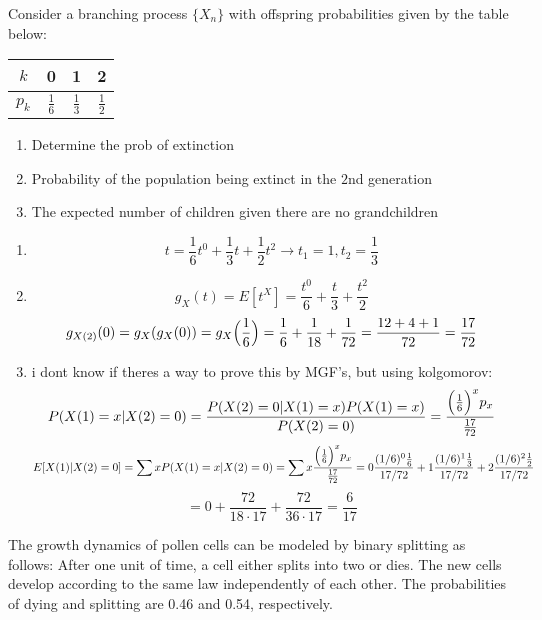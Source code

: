 \begin{enumerate}[label=(\alph*)]
\problem
Consider a branching process $\{X_n\}$ with offspring probabilities given by the table below:
\begin{center}
\begin{tabular}{c|c|c|c}
    $k$ & 0 & 1 & 2 \\ 
\hline
$p_k$ & $\frac{1}{6} $&$ \frac{1}{3}$ & $\frac{1}{2}$ \\ 
    
\end{tabular}
\end{center}
\begin{enumerate}
\item Determine the prob of extinction
\item Probability of the population being extinct in the $2$nd generation
\item The expected number of children given there are no grandchildren

\end{enumerate}


\solution
\begin{enumerate}
    \item \[
    t = \frac{1}{6}t^0 + \frac{1}{3}t + \frac{1}{2}t^2 \rightarrow t_1=1, t_2=\frac{1}{3}
    \]    
    \item \[
    g_X(t) = E[t^X] = \frac{t^0}{6} + \frac{t}{3} + \frac{t^2}{2} 
    \]
    \[
        g_{X(2)}(0) = g_X(g_X(0)) = g_X\Bigl(\frac{1}{6}\Bigr) = \frac{1}{6} + \frac{1}{18} + \frac{1}{72} = \frac{12+4+1}{72} = \frac{17}{72}     
    \]
    \item i dont know if theres a way to prove this by MGF's, but using kolgomorov:
    \[
        P(X(1)=x|X(2)=0) = \frac{P(X(2)=0|X(1)=x) P(X(1)=x)}{P(X(2)=0)} = \frac{\Bigl(\frac{1}{6}\Bigr)^x p_x}{\frac{17}{72}}
    \]
    \[
      E[X(1)|X(2)=0] = \sum x P(X(1)=x|X(2)=0)  = 
      \sum x \frac{\Bigl(\frac{1}{6}\Bigr)^x p_x}{\frac{17}{72}} =
      0\frac{(1/6)^0\frac{1}{6}}{17/72} + 1\frac{(1/6)^1\frac{1}{3}}{17/72} + 2\frac{(1/6)^2\frac{1}{2}}{17/72}
    \]
    \[
      = 0 + \frac{72}{18 \cdot 17} + \frac{72}{36 \cdot 17} = \frac{6}{17} 
    \]

\end{enumerate}


\problem
\problem
\problem
The growth dynamics of pollen cells can be modeled by binary splitting as follows: After one unit of time, a cell either splits into two or dies. The new cells develop according to the same law independently of each other. The probabilities of dying and splitting are 0.46 and 0.54, respectively.


\end{enumerate}
